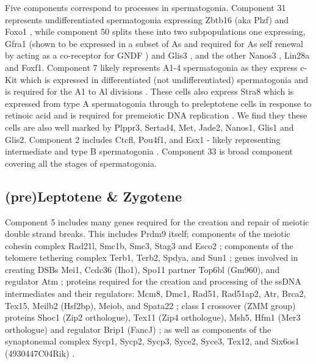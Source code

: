 Five components correspond to processes in spermatogonia. Component 31 represents undifferentiated spermatogonia expressing Zbtb16 (aka Plzf) \parencite{Buaas2004Plzf} and Foxo1 \parencite{Goertz2011Foxo1}, while component 50 splits these into two subpopulations one expressing, Gfra1 (shown to be expressed in a subset of As and required for As self renewal by acting as a co-receptor for GNDF \parencite{Meng2000Regulation,He2007Gfra1}) and Glis3 \parencite{Kang2016Transcription}, and the other Nanos3 \parencite{Suzuki2009heterogeneity}, Lin28a \parencite{Zheng2009pluripotency} and Foxf1. Component 7 likely represents A1-4 spermatogonia as they express c-Kit which is expressed in differentiated (not undifferentiated) spermatogonia \parencite{Manova1990Gonadal,Schrans-Stassen1999Differential} and is required for the A1 to Al divisions \parencite{Yoshinaga1991Role}. These cells also express Stra8 which is expressed from type A spermatogonia through to preleptotene cells in response to retinoic acid \parencite{Oulad-Abdelghani1996Characterization,Zhou2008Expressiona,Endo2015Periodic} and is required for premeiotic DNA replication \parencite{Baltus2006germ}. We find they these cells are also well marked by Plppr3, Sertad4, Met, Jade2, Nanos1, Glis1 and Glis2. Component 2 includes Ctcfl, Pou4f1, and Esx1 - likely representing intermediate and type B spermatogonia \parencite{Sleutels2012male, Budhram-Mahadeo2001closely, Maezawa2018Dynamic, Li1997Esx1, Branford1997Spx1}. Component 33 is broad component covering all the stages of spermatogonia.


\subsection{(pre)Leptotene \& Zygotene}

Component 5 includes many genes required for the creation and repair of meiotic double strand breaks. This includes Prdm9 itself; components of the meiotic cohesin complex Rad21l, Smc1b, Smc3, Stag3 and Esco2 \parencite{Rankin2015Complex}; components of the telomere tethering complex Terb1, Terb2, Spdya, and Sun1 \parencite{Ding2007SUN1, Tu2017Speedy, Wang2019meiotic}; genes involved in creating DSBs Mei1, Ccdc36 (Iho1), Spo11 partner Top6bl (Gm960), and regulator Atm \parencite{Lukaszewicz2018Control, Reinholdt2005Mei1, Robert2016TopoVIBLike, Stanzione2016Meiotic, Vrielynck2016DNA}; proteins required for the creation and processing of the ssDNA intermediates and their regulators: Mcm8, Dmc1, Rad51, Rad51ap2, Atr, Brca2, Tex15, Meilb2 (Hsf2bp), Meiob, and Spata22 \parencite{Brown2015Small, Brown2014DNA, Dai2017Meiotic, Kovalenko2006RAD51AP2, Lee2015MCM89, Martinez2016BRCA2, Pacheco2018ATR, Ribeiro2018MEIOB, Widger2018ATR, Xu2017Meiosisspecific, Yang2008Mouse, Zhang2019meiosisspecific}; class I crossover (ZMM group) proteins Shoc1 (Zip2 orthologue), Tex11 (Zip4 orthologue), Msh5, Hfm1 (Mer3 orthologue) and regulator Brip1 (FancJ) \parencite{Adelman2008ZIP4H, Guiraldelli2018SHOC1, Guiraldelli2013Mouse, Rakshambikai2013Structural, Sun2016FancJ}; as well as components of the synaptonemal complex Sycp1, Sycp2, Sycp3, Syce2, Syce3, Tex12, and Six6os1 (4930447C04Rik) \parencite{Gomez-H2016C14ORF39, Syrjanen2014molecular}.


